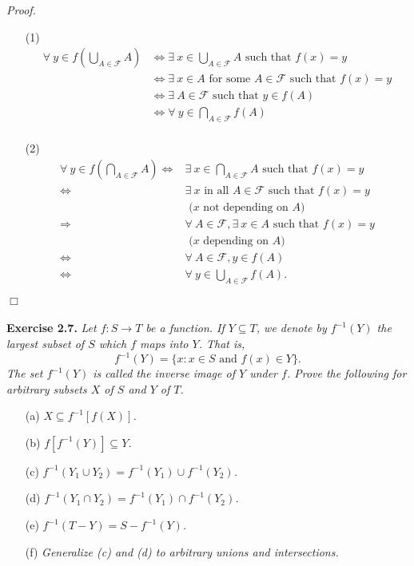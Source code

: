 \documentclass{article}
\begin{document}
\emph{Proof.}
\begin{enumerate}
\item[(1)]
\begin{align*}
  \forall \: y \in f\left( \bigcup_{A \in \mathscr{F}} A \right)
  &\Longleftrightarrow
  \exists \: x \in \bigcup_{A \in \mathscr{F}} A \text{ such that } f(x) = y \\
  &\Longleftrightarrow
  \exists \: x \in A \text{ for some } A \in \mathscr{F} \text{ such that } f(x) = y \\
  &\Longleftrightarrow
  \exists \: A \in \mathscr{F} \text{ such that } y \in f(A) \\
  &\Longleftrightarrow
  \forall \: y \in \bigcap_{A \in \mathscr{F}} f(A) \\
\end{align*}
\item[(2)]
\begin{align*}
  \forall \: y \in f\left( \bigcap_{A \in \mathscr{F}} A \right)
  \Longleftrightarrow&
  \exists \: x \in \bigcap_{A \in \mathscr{F}} A \text{ such that } f(x) = y \\
  \Longleftrightarrow&
  \exists \: x \text{ in all } A \in \mathscr{F} \text{ such that } f(x) = y \\
  &\text{ ($x$ not depending on $A$) } \\
  \Longrightarrow&
  \forall \: A \in \mathscr{F}, \exists \: x \in A \text{ such that } f(x) = y \\
  &\text{ ($x$ depending on $A$) } \\
  \Longleftrightarrow&
  \forall \: A \in \mathscr{F}, y \in f(A) \\
  \Longleftrightarrow&
  \forall \: y \in \bigcup_{A \in \mathscr{F}} f(A).
\end{align*}
\end{enumerate}
$\Box$ \\\\



\textbf{Exercise 2.7.}
\emph{Let $f: S \rightarrow T$ be a function.
If $Y \subseteq T$,
we denote by $f^{-1}(Y)$ the largest subset of $S$ which $f$ maps into $Y$.
That is,
$$f^{-1}(Y) = \{ x : x \in S \text{ and } f(x) \in Y \}.$$
The set $f^{-1}(Y)$ is called the inverse image of $Y$ under $f$.
Prove the following for arbitrary subsets $X$ of $S$ and $Y$ of $T$.}
\begin{enumerate}
\item[(a)]
\emph{$X \subseteq f^{-1}[f(X)]$.}
\item[(b)]
\emph{$f[f^{-1}(Y)] \subseteq Y$.}
\item[(c)]
\emph{$f^{-1}(Y_1 \cup Y_2) = f^{-1}(Y_1) \cup f^{-1}(Y_2)$.}
\item[(d)]
\emph{$f^{-1}(Y_1 \cap Y_2) = f^{-1}(Y_1) \cap f^{-1}(Y_2)$.}
\item[(e)]
\emph{$f^{-1}(T - Y) = S - f^{-1}(Y)$.}
\item[(f)]
\emph{Generalize (c) and (d) to arbitrary unions and intersections.} \\
\end{enumerate}
\end{document}
